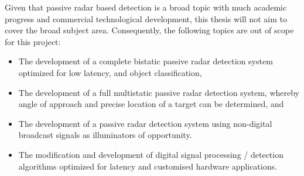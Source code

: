 \noindent
Given that passive radar based detection is a broad topic with much academic progress and commercial technological development, this thesis will not aim to cover the broad subject area. Consequently, the following topics are out of scope for this project:

\begin{itemize}
    \item The development of a complete bistatic passive radar detection system optimized for low latency, and object classification,
    \item The development of a full multistatic passive radar detection system, whereby angle of approach and precise location of a target can be determined, and
    \item The development of a passive radar detection system using non-digital broadcast signals as illuminators of opportunity.
    \item The modification and development of digital signal processing / detection algorithms optimized for latency and customised hardware applications.
\end{itemize}